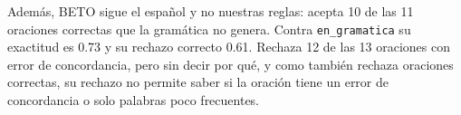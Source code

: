 Además, BETO sigue el español y no nuestras reglas: acepta 10 de las 11 oraciones correctas que
la gramática no genera. Contra \texttt{en\_gramatica} su exactitud es 0.73 y su rechazo correcto
0.61. Rechaza 12 de las 13 oraciones con error de concordancia, pero sin decir por qué, y como
también rechaza oraciones correctas, su rechazo no permite saber si la oración tiene un error de
concordancia o solo palabras poco frecuentes.
